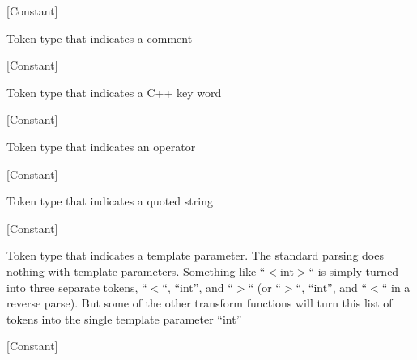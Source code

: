 \vspace{1em}
\noindent
{}
\usebox{\funcname}
 \hfill [Constant]

\begin{doc-string}
Token type that indicates a comment
\end{doc-string}

\vspace{1em}
\noindent
{}
\usebox{\funcname}
 \hfill [Constant]

\begin{doc-string}
Token type that indicates a C++ key word
\end{doc-string}

\vspace{1em}
\noindent
{}
\usebox{\funcname}
 \hfill [Constant]

\begin{doc-string}
Token type that indicates an operator
\end{doc-string}

\vspace{1em}
\noindent
{}
\usebox{\funcname}
 \hfill [Constant]

\begin{doc-string}
Token type that indicates a quoted string
\end{doc-string}

\vspace{1em}
\noindent
{}
\usebox{\funcname}
 \hfill [Constant]

\begin{doc-string}
Token type that indicates a template parameter.  The standard parsing does nothing
with template parameters.  Something like ``$<$int$>$`` is simply turned into three separate
tokens, ``$<$``, ``int'', and ``$>$`` (or ``$>$``, ``int'', and ``$<$`` in a reverse parse).
But some of the other transform functions will turn this list of tokens into the single
template parameter ``int''
\end{doc-string}

\vspace{1em}
\noindent
{}
\usebox{\funcname}
 \hfill [Constant]

